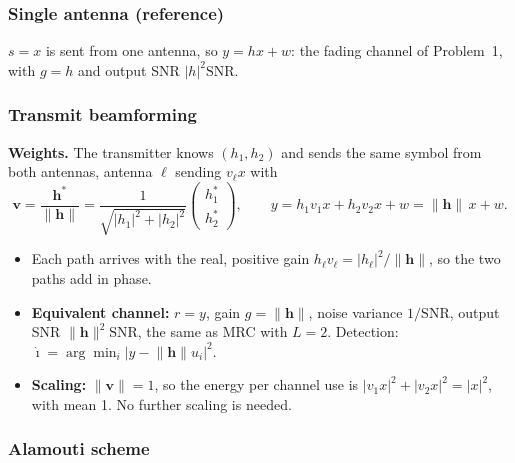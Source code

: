 \documentclass[11pt,a4paper]{article}
\newcommand{\snr}{\mathrm{SNR}}
\newcommand{\norm}[1]{\lVert #1 \rVert}
\newcommand{\abs}[1]{\lvert #1 \rvert}
\newcommand{\h}{\mathbf{h}}
\begin{document}
\subsubsection{Single antenna (reference)}

$s = x$ is sent from one antenna, so $y = hx + w$: the fading channel of Problem~1,
with $g = h$ and output SNR $\abs{h}^2\snr$.

\subsubsection{Transmit beamforming}

\textbf{Weights.} The transmitter knows $(h_1, h_2)$ and sends the same
symbol from both antennas, antenna $\ell$ sending $v_\ell x$ with
\begin{equation}
  \mathbf{v} = \frac{\h^*}{\norm{\h}} = \frac{1}{\sqrt{\abs{h_1}^2 + \abs{h_2}^2}}
  \begin{pmatrix} h_1^* \\ h_2^* \end{pmatrix},
  \qquad
  y = h_1v_1x + h_2v_2x + w = \norm{\h}\,x + w .
  \label{eq:p3-bf}
\end{equation}
\begin{itemize}
  \item Each path arrives with the real, positive gain
        $h_\ell v_\ell = \abs{h_\ell}^2/\norm{\h}$, so the two paths add in phase.
  \item \textbf{Equivalent channel:} $r = y$, gain $g = \norm{\h}$, noise variance
        $1/\snr$, output SNR $\norm{\h}^2\snr$, the same as MRC with $L = 2$. Detection:
        $\hat\imath = \arg\min_i \abs{y - \norm{\h}u_i}^2$.
  \item \textbf{Scaling:} $\norm{\mathbf{v}} = 1$, so the energy per channel use is
        $\abs{v_1x}^2 + \abs{v_2x}^2 = \abs{x}^2$, with mean 1. No further scaling is
        needed.
\end{itemize}

\subsubsection{Alamouti scheme}
\end{document}
